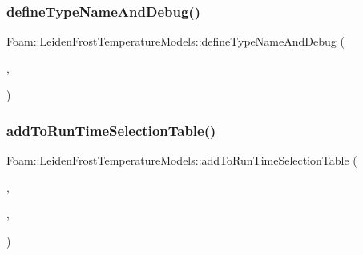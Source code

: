 \subsubsection{\texorpdfstring{define\+Type\+Name\+And\+Debug()}{defineTypeNameAndDebug()}}
{\footnotesize\ttfamily Foam\+::\+Leiden\+Frost\+Temperature\+Models\+::define\+Type\+Name\+And\+Debug (\begin{DoxyParamCaption}\item[{\hyperlink{classFoam_1_1LeidenFrostTemperatureModels_1_1GroeneveldStewart}{Groeneveld\+Stewart}}]{,  }\item[{0}]{ }\end{DoxyParamCaption})}

\mbox{\label{namespaceFoam_1_1LeidenFrostTemperatureModels_a998d7da77eb9239b6d5bce8abbc60b95}} 
\subsubsection{\texorpdfstring{add\+To\+Run\+Time\+Selection\+Table()}{addToRunTimeSelectionTable()}}
{\footnotesize\ttfamily Foam\+::\+Leiden\+Frost\+Temperature\+Models\+::add\+To\+Run\+Time\+Selection\+Table (\begin{DoxyParamCaption}\item[{\hyperlink{classFoam_1_1TLFModel}{T\+L\+F\+Model}}]{,  }\item[{\hyperlink{classFoam_1_1LeidenFrostTemperatureModels_1_1GroeneveldStewart}{Groeneveld\+Stewart}}]{,  }\item[{Leiden\+Frost\+Temperature\+Models}]{ }\end{DoxyParamCaption})}

